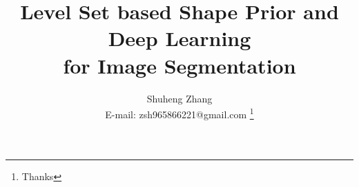 \documentclass[journal]{IEEEtran}
\begin{document}
%
\title{Level Set based Shape Prior and Deep Learning \\for Image Segmentation}


%
\author{Shuheng Zhang \\ E-mail: zsh965866221@gmail.com
    \thanks{Thanks}
}

%
%

%
\end{document}
